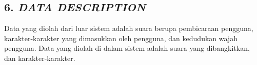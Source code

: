 \subsection*{\textcolor{subsectioncolor}{\textsf{6. \textit{DATA DESCRIPTION}}}}


Data yang diolah dari luar sistem adalah suara berupa pembicaraan pengguna, karakter-karakter yang dimasukkan oleh pengguna, dan kedudukan wajah pengguna.
Data yang diolah di dalam sistem adalah suara yang dibangkitkan, dan karakter-karakter.
